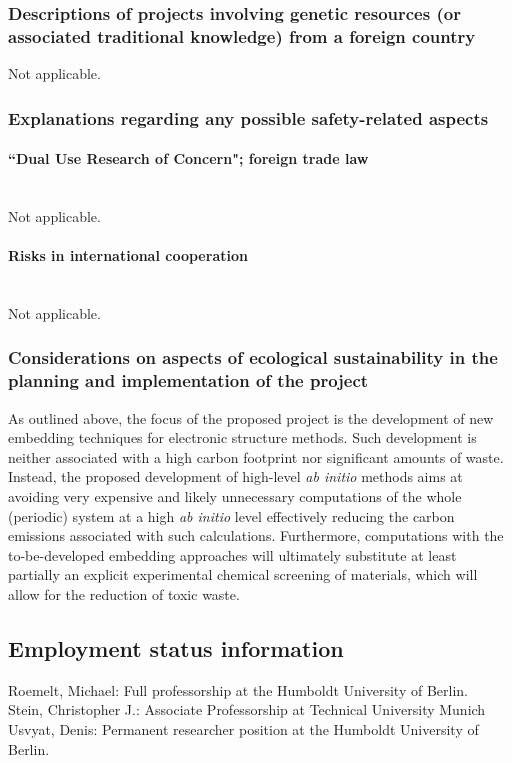 \documentclass[a4paper,11pt,headings=normal]{scrartcl}
\begin{document}
\subsubsection{Descriptions of projects involving genetic resources (or 
associated traditional knowledge) from a foreign country}
Not applicable.

\subsubsection{Explanations regarding any possible safety-related aspects} 
\paragraph{“Dual Use Research of Concern"; foreign trade law}\ \\
\noindent
Not applicable.

\paragraph{Risks in international cooperation}\ \\
\noindent
Not applicable.

\subsubsection{Considerations on aspects of ecological sustainability in the 
planning and implementation of the project}
As outlined above, the focus of the proposed project is the development of new 
embedding techniques for electronic structure methods. Such development is neither 
associated with a high carbon footprint nor significant amounts of waste. Instead, 
the proposed development of high-level \textit{ab initio} methods aims at 
avoiding very expensive and likely unnecessary computations of the whole 
(periodic) system at a high \textit{ab initio} level effectively reducing the 
carbon emissions associated with such calculations. Furthermore, computations with 
the to-be-developed embedding approaches will ultimately substitute at least 
partially an explicit experimental chemical screening of materials, which will 
allow for the reduction of toxic waste. 


\subsection{Employment status information}
Roemelt, Michael: Full professorship at the Humboldt University of Berlin.\\
Stein, Christopher J.: Associate Professorship at Technical University Munich\\
Usvyat, Denis: Permanent researcher position at the Humboldt University of 
Berlin.
\end{document}
